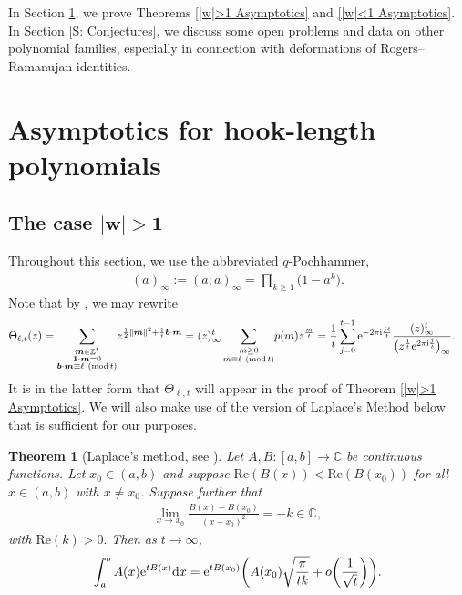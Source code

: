 \documentclass[pdftex]{sigma}
\numberwithin{equation}{section}
\newtheorem{Theorem}{Theorem}[section]
\begin{document}
 In Section \ref{S: Asymptotics}, we prove Theorems \ref{|w|>1 Asymptotics} and \ref{|w|<1 Asymptotics}. In Section \ref{S: Conjectures}, we discuss some open problems and data on other polynomial families, especially in connection with deformations of Rogers--Ramanujan identities.

\section{Asymptotics for hook-length polynomials} \label{S: Asymptotics}

\subsection[The case |w|>1]{The case $\boldsymbol{|w|>1}$} %

Throughout this section, we use the abbreviated $q$-Pochhammer,
\begin{align*}
(a)_{\infty}:=(a;a)_{\infty}=\prod_{k \geq 1} \big(1-a^k\big).
\end{align*}
Note that by \cite[equation~(3.1)]{GKS}, we may rewrite
\begin{align*}
 \Theta_{\ell,t}(z)&{}=\sum_{\substack{\boldsymbol{m}\in \mathbb{Z}^t \\ \boldsymbol{1} \cdot \boldsymbol{m}=0 \\ \boldsymbol{b}\cdot \boldsymbol{m} \equiv \ell \ (\text{mod}\, {t}) }} \! z^{\frac{1}{2}\|\boldsymbol{m}\|^2+\frac{1}{t}\boldsymbol{b}\cdot \boldsymbol{m}}
 = (z)_{\infty}^t \sum_{\substack{m \geq 0 \\ m \equiv \ell \ (\text{mod}\, {t})}}\! p(m)z^{\frac{m}{t}}
=\frac{1}{t}\sum_{j=0}^{ t-1}{\rm e}^{-2\pi {\rm i} \frac{j\ell}{t}}\frac{(z)_{\infty}^t}{\big(z^{\frac{1}{t}}{\rm e}^{2\pi {\rm i} \frac{j}{t}}\big)_{\infty}}.
\end{align*}
It is in the latter form that $\Theta_{\ell,t}$ will appear in the proof of Theorem \ref{|w|>1 Asymptotics}. We will also make use of the version of Laplace's Method below that is sufficient for our purposes.
\begin{Theorem}[Laplace's method, see {\cite[Section 1.1.5]{Pinsky}}]\label{T:LaplaceMethod}
 Let $A,B\colon [a,b]\to \mathbb{C}$ be continuous functions. Let $x_0 \in (a,b)$ and suppose $\mathrm{Re}(B(x))<\mathrm{Re}(B(x_0))$ for all $x\in (a,b)$ with $x \neq x_0$. Suppose further that
 \begin{align*}
 \lim_{x\to x_0}\frac{B(x)-B(x_0)}{(x-x_0)^2} = -k\in \mathbb{C},
 \end{align*}
 with $\mathrm{Re}(k)>0.$ Then as $t \to \infty$,
 \begin{align*}
 \int^b_{a}A(x){\rm e}^{tB(x)}{\rm d}x = {\rm e}^{tB(x_0)}\biggl(A(x_0)\sqrt{\frac{\pi}{tk}}+o\biggl(\frac{1}{\sqrt{t}}\biggr)\biggr).
 \end{align*}
\end{Theorem}
\end{document}
